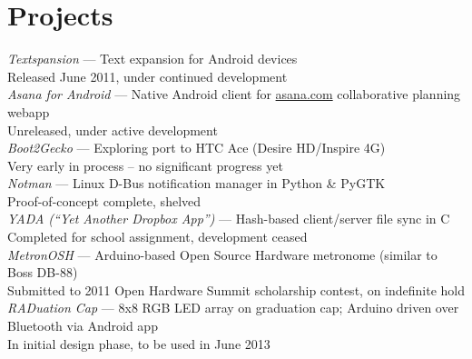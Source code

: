 \documentclass[10pt]{barag_resume}
\begin{document}
	\newpage
	\section{Projects}%
		{\large \emph{Textspansion}} --- Text expansion for Android devices\\{\setlength{\parindent}{1em}
			\indent Released June 2011, under continued development\\
		{\large \emph{Asana for Android}} --- Native Android client for \url{asana.com} collaborative planning webapp\\
			\indent Unreleased, under active development\\
		{\large \emph{Boot2Gecko}} --- Exploring port to HTC Ace (Desire HD/Inspire 4G)\\
			\indent Very early in process -- no significant progress yet\\
		{\large \emph{Notman}} --- Linux D-Bus notification manager in Python \& PyGTK\\
			\indent Proof-of-concept complete, shelved\\
		{\large \emph{YADA (``Yet Another Dropbox App'')}} --- Hash-based client/server file sync in C\\
			\indent Completed for school assignment, development ceased\\
		{\large \emph{MetronOSH}} --- Arduino-based Open Source Hardware metronome (similar to Boss DB-88)\\
			\indent Submitted to 2011 Open Hardware Summit scholarship contest, on indefinite hold\\
		{\large \emph{RADuation Cap}} --- 8x8 RGB LED array on graduation cap; Arduino driven over Bluetooth via Android app\\
			\indent In initial design phase, to be used in June 2013}
\end{document}
